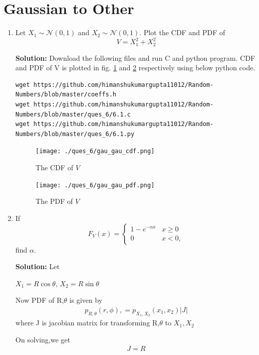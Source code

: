 \documentclass[journal,12pt,twocolumn]{IEEEtran}
\renewcommand\thesection{\arabic{section}}
\providecommand{\brak}[1]{\ensuremath{\left(#1\right)}}
\theoremstyle{remark}
\providecommand{\gauss}[2]{\mathcal{N}\ensuremath{\left(#1,#2\right)}}
\newcommand{\solution}{\noindent \textbf{Solution: }}
\numberwithin{equation}{section}
\begin{document}
\section{Gaussian to Other}
\begin{enumerate}[label=\thesection.\arabic*
,ref=\thesection.\theenumi]
\item
Let $X_1 \sim  \gauss{0}{1}$ and $X_2 \sim  \gauss{0}{1}$. Plot the CDF and PDF of
%
\begin{equation}
V = X_1^2 + X_2^2
\end{equation}

\solution 
Download the following files and run C and python program.
CDF and PDF of V is plotted in fig. \ref{gau_gau_cdf} and \ref{gau_gau_pdf} respectively using below python code.
\begin{lstlisting}
wget https://github.com/himanshukumargupta11012/Random-Numbers/blob/master/coeffs.h
wget https://github.com/himanshukumargupta11012/Random-Numbers/blob/master/ques_6/6.1.c
wget https://github.com/himanshukumargupta11012/Random-Numbers/blob/master/ques_6/6.1.py
\end{lstlisting}

\begin{figure}
	\centering
	\texttt{[image: ./ques\_6/gau\_gau\_cdf.png]}
	\caption{The CDF of $V$}
	\label{gau_gau_cdf}
\end{figure}
\begin{figure}
	\centering
	\texttt{[image: ./ques\_6/gau\_gau\_pdf.png]}
	\caption{The PDF of $V$}
	\label{gau_gau_pdf}
\end{figure}
\item
If
%
\begin{equation}
F_{V}(x) = 
\begin{cases}
1 - e^{-\alpha x} & x \geq 0 \\
0 & x < 0,
\end{cases}
\end{equation}
%
find $\alpha$.

\solution Let 

$X_1=R\cos\theta$, $X_2=R\sin\theta$

Now PDF of R,$\theta$ is given by
\begin{align}
	p_{R,\theta}\brak{r,\phi},=p_{X_1,X_2}\brak{x_1,x_2}|J|	
\end{align}
where J is jacobian matrix for transforming R,$\theta$ to $X_1,X_2$

On solving,we get 
\begin{align}
J=R 	
\end{align}



\end{enumerate}
\end{document}
